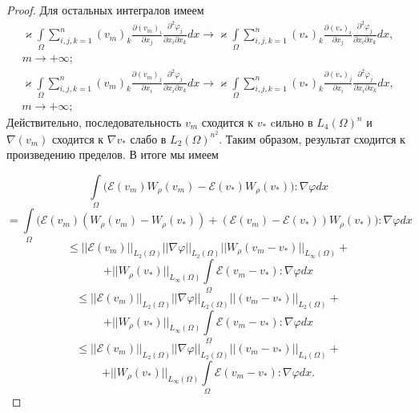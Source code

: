 \begin{proof}
    Для остальных интегралов имеем
    \begin{equation*}
        \begin{gathered}
            \varkappa \int\limits_{\Omega}\sum_{i,j,k=1}^n (v_m)_k
            \frac{\partial (v_m)_i}{\partial x_j} \frac{\partial^2 \varphi_j}{\partial x_i \partial x_k} dx \rightarrow
            \varkappa \int\limits_{\Omega}\sum_{i,j,k=1}^n (v_*)_k
            \frac{\partial (v_*)_i}{\partial x_j} \frac{\partial^2 \varphi_j}{\partial x_i \partial x_k} dx,\\
            m \rightarrow +\infty;
        \end{gathered}
    \end{equation*}
    \begin{equation*}
        \begin{gathered}
            \varkappa \int\limits_{\Omega}\sum_{i,j,k=1}^n (v_m)_k
            \frac{\partial (v_m)_j}{\partial x_i} \frac{\partial^2 \varphi_j}{\partial x_i \partial x_k} dx \rightarrow
            \varkappa \int\limits_{\Omega}\sum_{i,j,k=1}^n (v_*)_k
            \frac{\partial (v_*)_j}{\partial x_i} \frac{\partial^2 \varphi_j}{\partial x_i \partial x_k} dx,\\
            m \rightarrow +\infty;
        \end{gathered}
    \end{equation*}
    Действительно, последовательность $v_m$ сходится к $v_*$ cильно в $L_4(\Omega)^n$
    и $\nabla(v_m)$ сходится к $\nabla v_*$ слабо в $L_2(\Omega)^{n^2}$.
    Таким образом, результат сходится к произведению пределов. В итоге мы имеем

    $$\int\limits_{\Omega} \bigg(\mathcal{E}(v_m)W_\rho (v_m) - \mathcal{E}(v_*)W_\rho(v_*)\bigg): \nabla\varphi dx$$
    $$= \int\limits_{\Omega} \bigg(\mathcal{E}(v_m)(W_\rho (v_m) - W_\rho(v_*))
    + (\mathcal{E}(v_m) - \mathcal{E}(v_*))W_\rho (v_*)\bigg): \nabla\varphi dx$$
    $$\leq ||\mathcal{E}(v_m)||_{L_2(\Omega)}||\nabla\varphi||_{L_2(\Omega)}||W_\rho(v_m - v_*)||_{L_\infty(\Omega)} +$$
    $$+ ||W_\rho(v_*)||_{L_\infty(\Omega)} \int\limits_{\Omega}\mathcal{E}(v_m - v_*): \nabla\varphi dx$$
    $$\leq ||\mathcal{E}(v_m)||_{L_2(\Omega)}||\nabla\varphi||_{L_2(\Omega)}||(v_m - v_*)||_{L_2(\Omega)} +$$
    $$+ ||W_\rho(v_*)||_{L_\infty(\Omega)} \int\limits_{\Omega}\mathcal{E}(v_m - v_*): \nabla\varphi dx$$
    $$\leq ||\mathcal{E}(v_m)||_{L_2(\Omega)}||\nabla\varphi||_{L_2(\Omega)}||(v_m - v_*)||_{L_4(\Omega)} +$$
    $$+ ||W_\rho(v_*)||_{L_\infty(\Omega)} \int\limits_{\Omega}\mathcal{E}(v_m - v_*): \nabla\varphi dx.$$


\end{proof}
